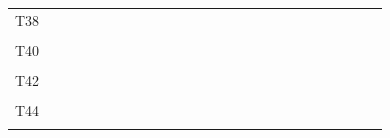 \documentclass[
]{article}
\begin{document}
\begin{longtable}[l]{lllllllllllllllllllllllll}
T38 &  &  &  &  &  &  &  &  &  &  &  &  &  &  &  &  &  &  &  &  &  &  &  & \\
\cellcolor{gray!6}{T39} & \cellcolor{gray!6}{} & \cellcolor{gray!6}{} & \cellcolor{gray!6}{} & \cellcolor{gray!6}{} & \cellcolor{gray!6}{} & \cellcolor{gray!6}{} & \cellcolor{gray!6}{} & \cellcolor{gray!6}{} & \cellcolor{gray!6}{} & \cellcolor{gray!6}{} & \cellcolor{gray!6}{} & \cellcolor{gray!6}{} & \cellcolor{gray!6}{} & \cellcolor{gray!6}{} & \cellcolor{gray!6}{} & \cellcolor{gray!6}{} & \cellcolor{gray!6}{} & \cellcolor{gray!6}{} & \cellcolor{gray!6}{} & \cellcolor{gray!6}{} & \cellcolor{gray!6}{} & \cellcolor{gray!6}{} & \cellcolor{gray!6}{} & \cellcolor{gray!6}{}\\
T40 &  &  &  &  &  &  &  &  &  &  &  &  &  &  &  &  &  &  &  &  &  &  &  & \\
\addlinespace
\cellcolor{gray!6}{T41} & \cellcolor{gray!6}{} & \cellcolor{gray!6}{} & \cellcolor{gray!6}{} & \cellcolor{gray!6}{} & \cellcolor{gray!6}{} & \cellcolor{gray!6}{} & \cellcolor{gray!6}{} & \cellcolor{gray!6}{} & \cellcolor{gray!6}{} & \cellcolor{gray!6}{} & \cellcolor{gray!6}{} & \cellcolor{gray!6}{} & \cellcolor{gray!6}{} & \cellcolor{gray!6}{} & \cellcolor{gray!6}{} & \cellcolor{gray!6}{} & \cellcolor{gray!6}{} & \cellcolor{gray!6}{} & \cellcolor{gray!6}{} & \cellcolor{gray!6}{} & \cellcolor{gray!6}{} & \cellcolor{gray!6}{} & \cellcolor{gray!6}{} & \cellcolor{gray!6}{}\\
T42 &  &  &  &  &  &  &  &  &  &  &  &  &  &  &  &  &  &  &  &  &  &  &  & \\
\cellcolor{gray!6}{T43} & \cellcolor{gray!6}{} & \cellcolor{gray!6}{} & \cellcolor{gray!6}{} & \cellcolor{gray!6}{} & \cellcolor{gray!6}{} & \cellcolor{gray!6}{} & \cellcolor{gray!6}{} & \cellcolor{gray!6}{} & \cellcolor{gray!6}{} & \cellcolor{gray!6}{} & \cellcolor{gray!6}{} & \cellcolor{gray!6}{} & \cellcolor{gray!6}{} & \cellcolor{gray!6}{} & \cellcolor{gray!6}{} & \cellcolor{gray!6}{} & \cellcolor{gray!6}{} & \cellcolor{gray!6}{} & \cellcolor{gray!6}{} & \cellcolor{gray!6}{} & \cellcolor{gray!6}{} & \cellcolor{gray!6}{} & \cellcolor{gray!6}{} & \cellcolor{gray!6}{}\\
T44 &  &  &  &  &  &  &  &  &  &  &  &  &  &  &  &  &  &  &  &  &  &  &  & \\
\cellcolor{gray!6}{T45} & \cellcolor{gray!6}{} & \cellcolor{gray!6}{} & \cellcolor{gray!6}{} & \cellcolor{gray!6}{} & \cellcolor{gray!6}{} & \cellcolor{gray!6}{} & \cellcolor{gray!6}{} & \cellcolor{gray!6}{} & \cellcolor{gray!6}{} & \cellcolor{gray!6}{} & \cellcolor{gray!6}{} & \cellcolor{gray!6}{} & \cellcolor{gray!6}{} & \cellcolor{gray!6}{} & \cellcolor{gray!6}{} & \cellcolor{gray!6}{} & \cellcolor{gray!6}{} & \cellcolor{gray!6}{} & \cellcolor{gray!6}{} & \cellcolor{gray!6}{} & \cellcolor{gray!6}{} & \cellcolor{gray!6}{} & \cellcolor{gray!6}{} & \cellcolor{gray!6}{}\\

\end{longtable}
\end{document}
